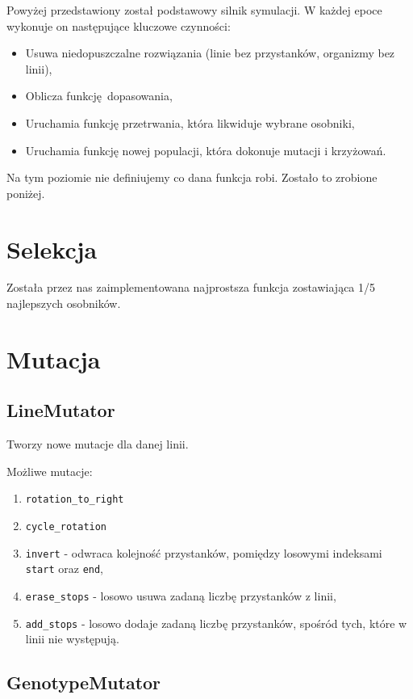 \documentclass[12pt,a4paper,openright]{mwrep}
\begin{document}
	Powyżej przedstawiony został podstawowy silnik symulacji. W każdej epoce wykonuje on następujące kluczowe czynności:
	\begin{itemize}
		\item Usuwa niedopuszczalne rozwiązania (linie bez przystanków, organizmy bez linii),
		\item Oblicza funkcję dopasowania,
		\item Uruchamia funkcję przetrwania, która likwiduje wybrane osobniki,
		\item Uruchamia funkcję nowej populacji, która dokonuje mutacji i krzyżowań.
	\end{itemize}

	Na tym poziomie nie definiujemy co dana funkcja robi. Zostało to zrobione poniżej.

\section{Selekcja}
Została przez nas zaimplementowana najprostsza funkcja zostawiająca 1/5 najlepszych osobników.

\section{Mutacja}

\subsection{LineMutator}
Tworzy nowe mutacje dla danej linii.

Możliwe mutacje:

\begin{enumerate}
    \item \lstinline{rotation_to_right}
    \item \lstinline{cycle_rotation}
    \item \lstinline{invert} - odwraca kolejność przystanków, pomiędzy losowymi indeksami \lstinline{start} oraz \lstinline{end},
    \item \lstinline{erase_stops} - losowo usuwa zadaną liczbę przystanków z linii,
    \item \lstinline{add_stops} - losowo dodaje zadaną liczbę przystanków, spośród tych, które w linii nie występują.
\end{enumerate}

\subsection{GenotypeMutator}
\end{document}
